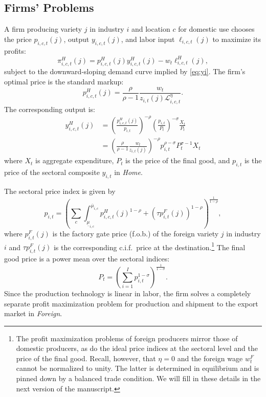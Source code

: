 \documentclass[onehalfspacing,11pt]{article}
\begin{document}
\subsection{Firms' Problems}\label{sec:problems}
A firm producing variety $j$ in industry $i$ and location $c$ for domestic use chooses the price $p_{i,c,t}(j)$, output $y_{i,c,t}(j)$, and
labor input $\ell_{i,c,t}(j)$ to maximize its profits: 
\begin{equation}
\pi_{i,c,t}^H(j) = p_{i,c,t}^H(j) y_{i,c,t}^H(j) - w_{t}\ell_{i,c,t}^H(j),  \label{eq:profit_max_static}
\end{equation}%
subject to the downward-sloping demand curve implied by \eqref{eq:yi}. The firm's optimal price is the standard
markup: 
\begin{equation}
p_{i,c,t}^H(j)=\frac{\rho }{\rho -1}\frac{w_{t}}{z_{i,t}(j) \mathcal{L}_{i,c,t}^\eta}.  \label{eq:monopolist_price}
\end{equation}%
The corresponding output is: 
\begin{align}
y_{i,c,t}^H(j) & =\left( \frac{p_{i,c,t}^H(j)}{p_{i,t}}\right) ^{-\rho} \left( \frac{p_{i,t}}{P_t} \right)^{-\sigma} \frac{X_{t}}{P_{t}} \nonumber \\
& =\left( \frac{\rho }{\rho -1}\frac{w_{t}}{z_{i,t}(j)}\right) ^{-\rho } p_{i,t}^{\rho-\sigma} P_t^{\sigma-1} X_t
\label{eq:monopolist_output}
\end{align}%
where $X_{t}$ is aggregate expenditure, $P_{t}$ is the price of the final good, and $p_{i,t}$ is the price of the sectoral composite $y_{i,t}$ in {\it Home}.

The sectoral price index is given by
\begin{equation}
\label{ }
p_{i,t} = \left( \sum_c \int_{\underline{\mu}_{i,c}}^{\overline{\mu}_{i,c}} p_{i,c,t}^H(j)^{1-\rho} + \left( \tau p_{i,t}^F(j) \right)^{1-\rho} \right)^{\frac{1}{1-\rho}},
\end{equation}
where $p_{i,t}^F(j)$ is the factory gate price (f.o.b.) of the foreign variety $j$ in industry $i$ and $\tau p_{i,t}^F(j)$ is the corresponding c.i.f.~price at the destination.\footnote{The profit maximization problems of foreign producers mirror those of domestic producers, as do the ideal price indices at the sectoral level and the price of the final good. Recall, however, that $\eta=0$ and the foreign wage $w_t^F$ cannot be normalized to unity. The latter is determined in equilibrium and is pinned down by a balanced trade condition. We will fill in these details in the next version of the manuscript.} The final good price is a power mean over the sectoral indices:
\begin{equation}
\label{ }
P_t = \left( \sum_{i=1}^I p_{i,t}^{1-\sigma} \right)^{\frac{1}{1-\sigma}}.
\end{equation}
Since the production technology is linear in labor, the firm solves a completely separate profit maximization problem for production and shipment to the export market in {\it Foreign}.
\end{document}
